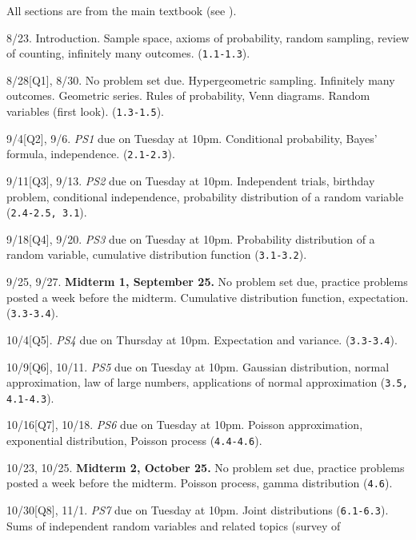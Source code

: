 \documentclass[oneside,11pt]{amsart}
\begin{document}
\bigskip

All sections are from the main textbook (see ).

\medskip

\begin{enumerate}[\bf{}{[}week 1{]}]
	\item 8/23.
		Introduction. Sample space, axioms of probability, random sampling, review of counting,
		infinitely many outcomes.
		(\texttt{1.1-1.3}).
	\item 8/28[Q1], 8/30.
		No problem set due.
		Hypergeometric sampling. Infinitely many outcomes. Geometric series. 
		Rules of probability, Venn diagrams. Random variables (first look). 
		(\texttt{1.3-1.5}).
	\item 9/4[Q2], 9/6.
		\emph{PS1} due on Tuesday at 10pm.
		Conditional probability, Bayes' formula, independence.
		(\texttt{2.1-2.3}).
	\item 9/11[Q3], 9/13.
		\emph{PS2} due on Tuesday at 10pm.
		Independent trials, birthday problem, conditional independence, 
		probability distribution of a random variable
		(\texttt{2.4-2.5, 3.1}).
	\item 9/18[Q4], 9/20.
		\emph{PS3} due on Tuesday at 10pm.
		Probability distribution of a random variable,
		cumulative distribution function (\texttt{3.1-3.2}).
	\item 9/25, 9/27. \textbf{Midterm 1, September 25.}
		No problem set due, practice problems posted a week before the midterm.
		Cumulative distribution function, 
		expectation.
		(\texttt{3.3-3.4}).
	\item 10/4[Q5].
		\emph{PS4} due on Thursday at 10pm.
		Expectation and variance.
		(\texttt{3.3-3.4}).
	\item 10/9[Q6], 10/11.
		\emph{PS5} due on Tuesday at 10pm.
		Gaussian distribution, normal approximation,
		law of large numbers,
		applications of normal approximation
		(\texttt{3.5, 4.1-4.3}).
	\item 10/16[Q7], 10/18. 
		\emph{PS6} due on Tuesday at 10pm.
		Poisson approximation, exponential distribution, Poisson process
		(\texttt{4.4-4.6}).
	\item 10/23, 10/25. \textbf{Midterm 2, October 25.}
		No problem set due, practice problems posted a week before the midterm.
		Poisson process, gamma distribution (\texttt{4.6}). 
	\item 10/30[Q8], 11/1.
		\emph{PS7} due on Tuesday at 10pm.
		Joint distributions (\texttt{6.1-6.3}).
		Sums of independent random variables and related topics (survey of 

\end{enumerate}
\end{document}
